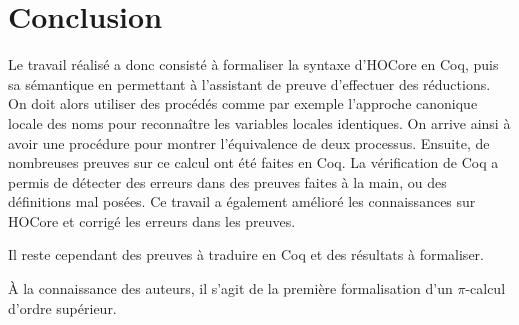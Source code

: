 \documentclass[11pt]{article}
\def\pic{$\pi$-calcul }
\begin{document}
\section{Conclusion}
Le travail réalisé a donc consisté à formaliser la syntaxe d'HOCore en Coq, puis sa sémantique en permettant à l'assistant de preuve d'effectuer des réductions. %
On doit alors utiliser des procédés comme par exemple l'approche canonique locale des noms pour reconnaître les variables locales identiques.
On arrive ainsi à avoir une procédure pour montrer l'équivalence de deux processus. %
Ensuite, de nombreuses preuves sur ce calcul ont été faites en Coq. La vérification de Coq a permis de détecter des erreurs dans des preuves faites à la main, ou des définitions mal posées. Ce travail a également amélioré les connaissances sur HOCore et corrigé les erreurs dans les preuves.

Il reste cependant des preuves à traduire en Coq et des résultats à formaliser.

À la connaissance des auteurs, il s'agit de la première formalisation d'un \pic d'ordre supérieur. 



\end{document}
